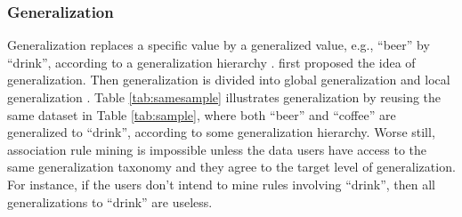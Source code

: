 \subsubsection{Generalization}

Generalization\cite{samarati1998,Iyengar:2002:TDS} replaces a specific value by
a generalized value, e.g., ``beer'' by ``drink'',
according to a generalization hierarchy \cite{FungWCY10:Survey}.
\cite{samarati1998} first proposed the idea of generalization.
Then generalization is divided into global generalization \cite{Iyengar:2002:TDS}
and local generalization \cite{LeFevre:2006:Mondrian}.
Table \ref{tab:samesample} illustrates generalization by reusing the
same dataset in Table \ref{tab:sample}, where both ``beer'' and ``coffee''
are generalized to ``drink'', according to some generalization hierarchy.
Worse still, association rule mining is impossible
unless the data users have access to the same generalization taxonomy
and they agree to the target level of generalization. For instance, if
the users don't intend to mine rules involving ``drink'', then
all generalizations to ``drink'' are useless.

